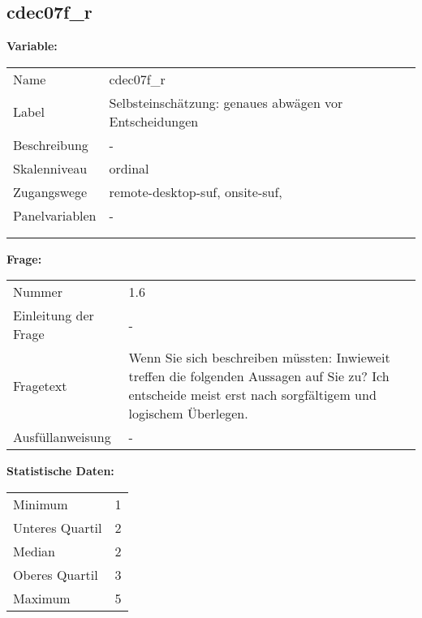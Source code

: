	
	
	\subsection{cdec07f\_r}
	\label{subSection:cdec07f_r}

	\noindent\textbf{Variable:}\\
		\begin{tabular}{lL{11.3cm}}
			\label{tableVariable:cdec07f_r}
			Name & cdec07f\_r \\
			Label & Selbsteinschätzung: genaues abwägen vor Entscheidungen \\
			Beschreibung & - \\
			Skalenniveau & ordinal \\
			Zugangswege &
				remote-desktop-suf,
				onsite-suf,
 \\
			Panelvariablen & -
			 \\
			 \\
 \\
		\end{tabular}

		\vspace*{1 cm}
		\noindent\textbf{Frage:}\\
		\begin{tabular}{lL{11.3cm}}
			\label{tableQuestion:cdec07f_r}
			Nummer & 1.6 \\
			Einleitung der Frage & - \\
			Fragetext & Wenn Sie sich beschreiben müssten: Inwieweit treffen die folgenden Aussagen auf Sie zu?
Ich entscheide meist erst nach sorgfältigem und logischem Überlegen. \\
			Ausfüllanweisung & - \\
		\end{tabular}


		\vspace*{1 cm}
		\noindent\textbf{Statistische Daten:}\\
			\begin{tabular}{ll}
				\label{tableStatistics:cdec07f_r}
					Minimum & 1 \\
					Unteres Quartil & 2 \\
					Median & 2 \\
					Oberes Quartil & 3 \\
					Maximum & 5 \\
			\end{tabular}



